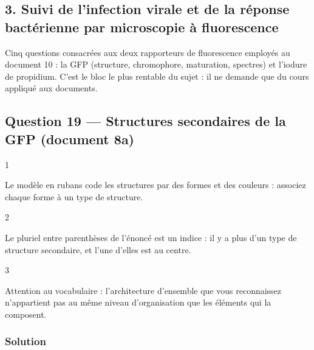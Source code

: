 \documentclass[11pt,a4paper]{article}
\begin{document}
\hypertarget{suivi-de-linfection-virale-et-de-la-ruxe9ponse-bactuxe9rienne-par-microscopie-uxe0-fluorescence}{%
\subsection{3. Suivi de l'infection virale et de la réponse bactérienne par microscopie à fluorescence}\label{suivi-de-linfection-virale-et-de-la-ruxe9ponse-bactuxe9rienne-par-microscopie-uxe0-fluorescence}}

Cinq questions consacrées aux deux rapporteurs de fluorescence employés au document 10 : la GFP (structure, chromophore, maturation, spectres) et l'iodure de propidium. C'est le bloc le plus rentable du sujet : il ne demande que du cours appliqué aux documents.

\hypertarget{question-19-structures-secondaires-de-la-gfp-document-8a}{%
\subsection{Question 19 --- Structures secondaires de la GFP (document 8a)}\label{question-19-structures-secondaires-de-la-gfp-document-8a}}

\begin{indication}{1}

Le modèle en rubans code les structures par des formes et des couleurs : associez chaque forme à un type de structure.

\end{indication}

\begin{indication}{2}

Le pluriel entre parenthèses de l'énoncé est un indice : il y a plus d'un type de structure secondaire, et l'une d'elles est au centre.

\end{indication}

\begin{indication}{3}

Attention au vocabulaire : l'architecture d'ensemble que vous reconnaissez n'appartient pas au même niveau d'organisation que les éléments qui la composent.

\end{indication}

\hypertarget{solution-18}{%
\subsubsection{Solution}\label{solution-18}}
\end{document}
